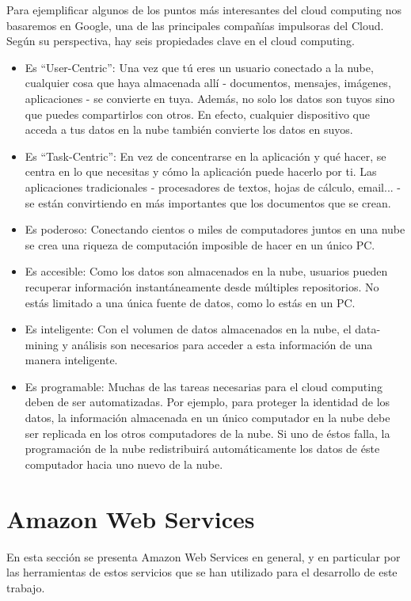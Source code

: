 \documentclass[runningheads]{llncs}
\begin{document}
Para ejemplificar algunos de los puntos más interesantes del cloud computing nos basaremos en Google, una de las principales 
compañías impulsoras del Cloud. Según su perspectiva, hay seis propiedades clave en el cloud computing.

\begin{itemize}

\item Es ``User-Centric'': Una vez que tú eres un usuario conectado a la nube, cualquier cosa que haya almacenada allí - documentos, mensajes, 
imágenes, aplicaciones - se convierte en tuya. Además, no solo los datos son tuyos sino que puedes compartirlos con otros. 
En efecto, cualquier dispositivo que acceda a tus datos en la nube también convierte los datos en suyos.
\item Es ``Task-Centric'': En vez de concentrarse en la aplicación y qué hacer, se centra en lo que necesitas y cómo la aplicación puede 
hacerlo por ti. Las aplicaciones tradicionales - procesadores de textos, hojas de cálculo, email... -  se están convirtiendo en más 
importantes que los documentos que se crean.
\item Es poderoso: Conectando cientos o miles de computadores juntos en una nube se crea una riqueza de computación imposible de hacer 
en un único PC.
\item Es accesible: Como los datos son almacenados en la nube, usuarios pueden recuperar información instantáneamente desde múltiples 
repositorios. No estás limitado a una única fuente de datos, como lo estás en un PC.
\item Es inteligente: Con el volumen de datos almacenados en la nube, el data-mining y análisis son necesarios para acceder a esta 
información de una manera inteligente.
\item Es programable: Muchas de las tareas necesarias para el cloud computing deben de ser automatizadas. Por ejemplo, para proteger 
la identidad de los datos, la información almacenada en un único computador en la nube debe ser replicada en los otros computadores 
de la nube. Si uno de éstos falla, la programación de la nube redistribuirá automáticamente los datos de éste computador hacia uno 
nuevo de la nube.

\end{itemize}




\section{Amazon Web Services}
\label{sec:aws}
En esta sección se presenta Amazon Web Services 
\cite{Eva11} en general, y en particular por las herramientas de estos servicios que se han utilizado para el desarrollo de 
este trabajo.
\end{document}
